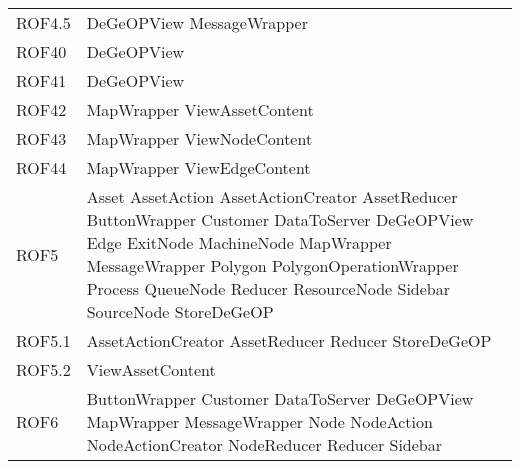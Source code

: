 \begin{longtable}{p{2.5cm}!{\VRule[1pt]}p{5cm}}
	ROF4.5 & DeGeOPView \newline MessageWrapper\\
	ROF40 & DeGeOPView\\
	ROF41 & DeGeOPView\\
	ROF42 & MapWrapper \newline ViewAssetContent\\
	ROF43 & MapWrapper \newline ViewNodeContent\\
	ROF44 & MapWrapper \newline ViewEdgeContent\\
	ROF5 & Asset \newline AssetAction \newline AssetActionCreator \newline AssetReducer \newline ButtonWrapper \newline Customer \newline DataToServer \newline DeGeOPView \newline Edge \newline ExitNode \newline MachineNode \newline MapWrapper \newline MessageWrapper \newline Polygon \newline PolygonOperationWrapper \newline Process \newline QueueNode \newline Reducer \newline ResourceNode \newline Sidebar \newline SourceNode \newline StoreDeGeOP\\
	ROF5.1 & AssetActionCreator \newline AssetReducer \newline Reducer \newline StoreDeGeOP\\
	ROF5.2 & ViewAssetContent\\
	ROF6 & ButtonWrapper \newline Customer \newline DataToServer \newline DeGeOPView \newline MapWrapper \newline MessageWrapper \newline Node \newline NodeAction \newline NodeActionCreator \newline NodeReducer \newline Reducer \newline Sidebar\\

\end{longtable}
